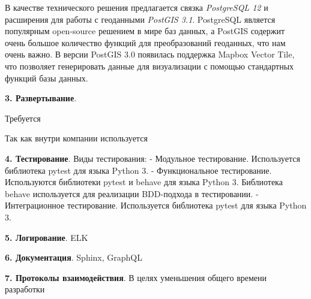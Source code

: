 В качестве технического решения предлагается связка \textit{PostgreSQL 12} и расширения для работы с геоданными
\textit{PostGIS 3.1}. PostgreSQL является популярным open-source решением в мире баз данных,
а PostGIS содержит очень большое количество функций для преобразований геоданных, что нам очень важно.
В версии PostGIS 3.0 появилась поддержка Mapbox Vector Tile, что позволяет генерировать данные для визуализации с помощью
стандартных функций базы данных.

\noindent \textbf{3. Развертывание}.

Требуется

Так как внутри компании используется

\noindent \textbf{4. Тестирование}.
Виды тестирования:
- Модульное тестирование. Используется библиотека pytest для языка Python 3.
- Функциональное тестирование. Используются библиотеки pytest и behave для языка Python 3. Библиотека behave используется для реализации BDD-подхода в тестировании.
- Интеграционное тестирование. Используется библиотека pytest для языка Python 3.

\noindent \textbf{5. Логирование}.
ELK

\noindent \textbf{6. Документация}.
Sphinx, GraphQL

\noindent \textbf{7. Протоколы взаимодействия}.
В целях уменьшения общего времени разработки
